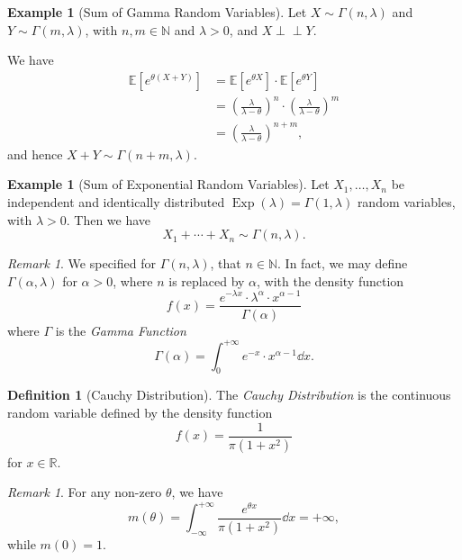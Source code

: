 \documentclass[11pt]{article}
\numberwithin{equation}{section}
\theoremstyle{definition}
\newtheorem{definition}[theorem]{Definition}
\newtheorem{example}[theorem]{Example}
\theoremstyle{remark}
\newtheorem{remark}[theorem]{Remark}
\newcommand{\pqty}[1]{\left(#1\right)}
\newcommand{\bqty}[1]{\left[#1\right]}
\newcommand{\RR}{\mathbb R}
\newcommand{\NN}{\mathbb N}
\newcommand{\plusinfty}{+\infty}
\newcommand{\minusinfty}{-\infty}
\newcommand{\Expt}{\mathbb E}
\newcommand{\indp}{\mathrel{\perp\!\!\!\perp}}
\newcommand{\Exponential}{\operatorname{Exp}}
\begin{document}
\begin{example}[Sum of Gamma Random Variables]\label{probability-example-041}
    \label{probability-ex:sum-gamma}%
    Let \(X \sim \Gamma\pqty{n, \lambda}\) and \(Y \sim \Gamma\pqty{m, \lambda}\), with \(n, m \in \NN\) and \(\lambda > 0\), and \(X \indp Y\).

    We have
    \begin{align*}
        \Expt\bqty{e^{\theta \pqty{X + Y}}} &= \Expt\bqty{e^{\theta X}} \cdot \Expt\bqty{e^{\theta Y}} \\
        &= \pqty{\frac{\lambda}{\lambda - \theta}}^n \cdot \pqty{\frac{\lambda}{\lambda - \theta}}^m \\
        &= \pqty{\frac{\lambda}{\lambda - \theta}}^{n + m},
    \end{align*}
    and hence \(X + Y \sim \Gamma\pqty{n + m, \lambda}\).
\end{example}

\begin{example}[Sum of Exponential Random Variables]\label{probability-example-042}
    \label{probability-ex:sum-exponential}%
    Let \(X_1, \ldots, X_n\) be independent and identically distributed \(\Exponential\pqty{\lambda} = \Gamma\pqty{1, \lambda}\) random variables, with \(\lambda > 0\). Then we have
    \[
        X_1 + \cdots + X_n \sim \Gamma\pqty{n, \lambda}.
    \]
\end{example}

\begin{remark}\label{probability-remark-008}
    We specified for \(\Gamma\pqty{n, \lambda}\), that \(n \in \NN\). In fact, we may define \(\Gamma\pqty{\alpha, \lambda}\) for \(\alpha > 0\), where \(n\) is replaced by \(\alpha\), with the density function
    \[
        f\pqty{x} = \frac{e^{-\lambda x} \cdot \lambda^{\alpha} \cdot x^{\alpha - 1}}{\Gamma\pqty{\alpha}}
    \]
    where \(\Gamma\) is the \emph{Gamma Function}
    \[
        \Gamma\pqty{\alpha} = \int_{0}^{\plusinfty} e^{-x} \cdot x^{\alpha - 1} \dd{x}.
    \]
\end{remark}

\begin{definition}[Cauchy Distribution]\label{probability-definition-064}
    The \emph{Cauchy Distribution} is the continuous random variable defined by the density function
    \[
        f\pqty{x} = \frac{1}{\pi \pqty{1 + x^2}}
    \]
    for \(x \in \RR\).
\end{definition}

\begin{remark}\label{probability-remark-009}
    For any non-zero \(\theta\), we have
    \[
        m\pqty{\theta} = \int_{\minusinfty}^{\plusinfty} \frac{e^{\theta x}}{\pi \pqty{1 + x^2}} \dd{x} = \plusinfty,
    \]
    while \(m\pqty{0} = 1\).
\end{remark}
\end{document}
